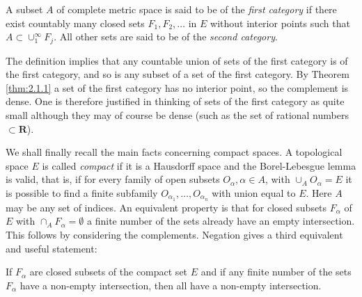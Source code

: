 \begin{dfn}
  A subset $A$ of complete metric space is said to be of the
  \emph{first category} if there exist countably many closed sets
  $F_1,F_2,\dots$ in $E$ without interior points such that
  $A\subset\cup_1^{\infty}F_j$. All other sets are said to be of the
  \emph{second category}.
\end{dfn}
The definition implies that any countable union of sets of the first
category is of the first category, and so is any subset of a set of the
first category. By Theorem \ref{thm:2.1.1} a set of the first category
has no interior point, so the complement is dense. One is therefore
justified in thinking of sets of the first category as quite small
although they may of course be dense (such as the set of rational
numbers $\subset\mathbf{R}$).

We shall finally recall the main facts concerning compact spaces. A
topological space $E$ is called \emph{compact} if it is a Hausdorff
space and the Borel-Lebesgue lemma is valid, that is, if for every
family of open subsets $O_{\alpha},\alpha\in A$, with
$\cup_AO_{\alpha}=E$ it is possible to find a finite subfamily
$O_{\alpha_1},\dots,O_{\alpha_n}$ with union equal to $E$. Here $A$
may be any set of indices. An equivalent property is that for closed
subsets $F_{\alpha}$ of $E$ with $\cap_AF_{\alpha}=\emptyset$ a finite
number of the sets already have an empty intersection. This follows by
considering the complements. Negation gives a third equivalent and
useful statement:

If $F_{\alpha}$ are closed subsets of the compact set $E$ and if any
finite number of the sets $F_{\alpha}$ have a non-empty intersection,
then all have a non-empty intersection.

